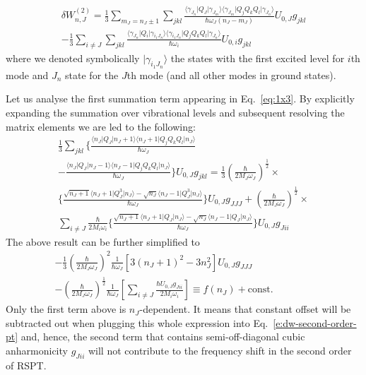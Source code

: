\documentclass[b5paper,oneside,fleqn,11pt]{book}
\begin{document}
\begin{refsection}
\begin{multline}
\delta W_{n,J}^{(2)} =
\frac{1}{3}
\sum_{m_J= n_J \pm 1} 
\sum_{jkl}
\frac{
   \langle \gamma_{J_n} \vert Q_J \vert \gamma_{J_m}          \rangle
   \langle \gamma_{J_m} \vert Q_jQ_kQ_l \vert \gamma_{J_n}    \rangle
}{\hbar \omega_J (n_J-m_J) } U_{0,J} g_{jkl}                    \\
%
- \frac{1}{3}
\sum_{i\ne J}
\sum_{jkl}
\frac{
   \langle \gamma_{J_n} \vert Q_i \vert \gamma_{i_1J_n}        \rangle
   \langle \gamma_{i_1J_n} \vert Q_jQ_kQ_l \vert \gamma_{J_n}  \rangle
}{\hbar \omega_i } U_{0,i} g_{jkl}                    
\qquad
\end{multline}
%
where we denoted symbolically $\vert \gamma_{i_1J_n} \rangle$ the states 
with the first excited level for $i$th mode and $J_n$ state for the $J$th mode
(and all other modes in ground states).

Let us analyse the first summation term appearing in Eq.~\eqref{eq:1x3}.
By explicitly expanding the summation over vibrational levels and subsequent resolving
the matrix elements we are led to the following:
%
\begin{multline}
\frac{1}{3}  \sum_{jkl}
  \Bigg\{ 
   \frac{\langle n_J \vert Q_J \vert n_J+1 \rangle 
         \langle n_J+1 \vert Q_jQ_kQ_l \vert n_J \rangle}{\hbar \omega_J} \\
 - \frac{\langle n_J \vert Q_J \vert n_J-1 \rangle
         \langle n_J-1 \vert Q_jQ_kQ_l \vert n_J \rangle}{\hbar \omega_J}
  \Bigg\}     U_{0,J} g_{jkl} 
= 
\frac{1}{3} \left( \frac{\hbar}{2M_J\omega_J} \right)^\frac{1}{2} \times \\
  \Bigg\{
    \frac{\sqrt{n_J+1}\langle n_J+1 \vert Q_J^3 \vert n_J \rangle - \sqrt{n_J} 
         \langle n_J-1 \vert Q_J^3 \vert n_J \rangle}{\hbar\omega_J} 
  \Bigg\} U_{0,J} g_{JJJ} + \left( \frac{\hbar}{2M_J\omega_J} \right)^\frac{1}{2} \times \\
\sum_{i\ne J} \frac{\hbar}{2M_i\omega_i}
  \Bigg\{
     \frac{\sqrt{n_J+1}\langle n_J+1 \vert Q_J \vert n_J \rangle - \sqrt{n_J}
          \langle n_J-1 \vert Q_J \vert n_J \rangle}{\hbar\omega_J}
  \Bigg\} U_{0,J} g_{Jii}
\end{multline}
%
The above result can be further simplified to
%
\begin{multline}    \label{e:x552}
-\frac{1}{3} \left( \frac{\hbar}{2M_J\omega_J} \right)^2 \frac{1}{\hbar\omega_J} 
           \left[ 3\left( n_J+1 \right)^2 - 3n_J^2 \right] U_{0,J} g_{JJJ} \\ - 
     \left( \frac{\hbar}{2M_J\omega_J} \right)^\frac{1}{2} \frac{1}{\hbar\omega_J}
     \left[ \sum_{i\ne J} \frac{\hbar U_{0,J} g_{Jii}}{2M_i\omega_i} \right]  \equiv 
f(n_J) + \mathrm{const.} \qquad \qquad
\end{multline}
%
Only the first term above is $n_J$-dependent. It means that constant offset will be 
subtracted out when plugging this whole expression into Eq.~\eqref{e:dw-second-order-pt}
and, hence, the second term that contains semi\hyp{}off-diagonal cubic anharmonicity $g_{Jii}$ 
will not contribute to the frequency shift in the second order of RSPT.


\end{refsection}
\end{document}
